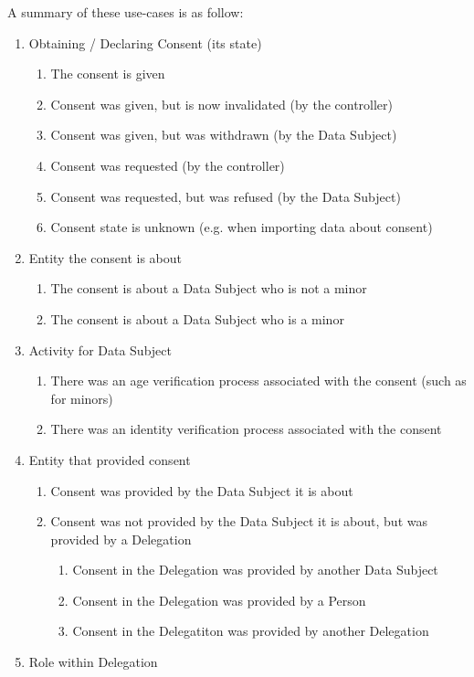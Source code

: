 A summary of these use-cases is as follow:
\begin{enumerate}
\item
  Obtaining / Declaring Consent (its state)

  \begin{enumerate}
  \item
    The consent is given
  \item
    Consent was given, but is now invalidated (by the controller)
  \item
    Consent was given, but was withdrawn (by the Data Subject)
  \item
    Consent was requested (by the controller)
  \item
    Consent was requested, but was refused (by the Data Subject)
  \item
    Consent state is unknown (e.g. when importing data about consent)
  \end{enumerate}
\item
  Entity the consent is about

  \begin{enumerate}
  \item
    The consent is about a Data Subject who is not a minor
  \item
    The consent is about a Data Subject who is a minor
  \end{enumerate}
\item
  Activity for Data Subject

  \begin{enumerate}
  \item
    There was an age verification process associated with the consent
    (such as for minors)
  \item
    There was an identity verification process associated with the
    consent
  \end{enumerate}
\item
  Entity that provided consent

  \begin{enumerate}
  \item
    Consent was provided by the Data Subject it is about
  \item
    Consent was not provided by the Data Subject it is about, but was
    provided by a Delegation

    \begin{enumerate}
    \item
      Consent in the Delegation was provided by another Data Subject
    \item
      Consent in the Delegation was provided by a Person
    \item
      Consent in the Delegatiton was provided by another Delegation
    \end{enumerate}
  \end{enumerate}
\item
  Role within Delegation


\end{enumerate}
